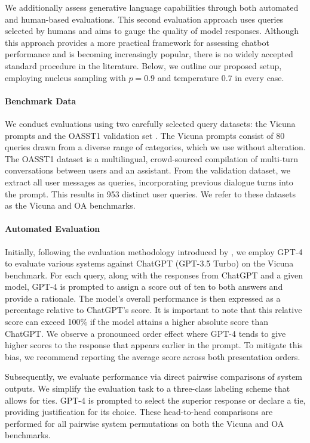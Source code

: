 We additionally assess generative language capabilities through both automated and human-based evaluations. This second evaluation approach uses queries selected by humans and aims to gauge the quality of model responses. Although this approach provides a more practical framework for assessing chatbot performance and is becoming increasingly popular, there is no widely accepted standard procedure in the literature. Below, we outline our proposed setup, employing nucleus sampling with $p=0.9$ and temperature $0.7$ in every case.

\paragraph{Benchmark Data} We conduct evaluations using two carefully selected query datasets: the Vicuna prompts \citep{vicuna2023} and the OASST1 validation set \citep{kopf2023openassistant}. The Vicuna prompts consist of 80 queries drawn from a diverse range of categories, which we use without alteration. The OASST1 dataset is a multilingual, crowd-sourced compilation of multi-turn conversations between users and an assistant. From the validation dataset, we extract all user messages as queries, incorporating previous dialogue turns into the prompt. This results in 953 distinct user queries. We refer to these datasets as the Vicuna and OA benchmarks.

\paragraph{Automated Evaluation} Initially, following the evaluation methodology introduced by \citet{vicuna2023}, we employ GPT-4 to evaluate various systems against ChatGPT (GPT-3.5 Turbo) on the Vicuna benchmark. For each query, along with the responses from ChatGPT and a given model, GPT-4 is prompted to assign a score out of ten to both answers and provide a rationale. The model’s overall performance is then expressed as a percentage relative to ChatGPT's score. It is important to note that this relative score can exceed 100\% if the model attains a higher absolute score than ChatGPT. We observe a pronounced order effect where GPT-4 tends to give higher scores to the response that appears earlier in the prompt. To mitigate this bias, we recommend reporting the average score across both presentation orders.

Subsequently, we evaluate performance via direct pairwise comparisons of system outputs. We simplify the evaluation task to a three-class labeling scheme that allows for ties. GPT-4 is prompted to select the superior response or declare a tie, providing justification for its choice. These head-to-head comparisons are performed for all pairwise system permutations on both the Vicuna and OA benchmarks.

